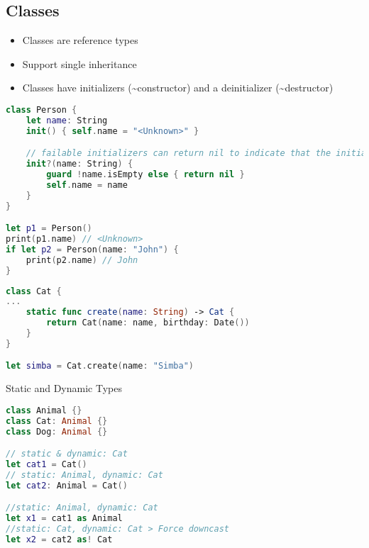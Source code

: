 
\hypertarget{classes}{%
\subsection{Classes}\label{classes}}

\begin{breakbox}

\begin{itemize}
\tightlist
\item
  Classes are reference types
\item
  Support single inheritance
\item
  Classes have initializers (\textasciitilde{}constructor) and a
  deinitializer (\textasciitilde{}destructor)
\end{itemize}

\end{breakbox}
\columnbreak


\begin{breakbox}

\begin{lstlisting}[language=swift]
class Person {
    let name: String
    init() { self.name = "<Unknown>" }

    // failable initializers can return nil to indicate that the initialization failed
    init?(name: String) {
        guard !name.isEmpty else { return nil }
        self.name = name
    }
}

let p1 = Person()
print(p1.name) // <Unknown>
if let p2 = Person(name: "John") {
    print(p2.name) // John
}
\end{lstlisting}
\end{breakbox}

\begin{breakbox}

\begin{lstlisting}[language=swift]
class Cat {
...
    static func create(name: String) -> Cat {
        return Cat(name: name, birthday: Date())
    }
}

let simba = Cat.create(name: "Simba")
\end{lstlisting}
\end{breakbox}

\begin{breakbox}

Static and Dynamic Types

\begin{lstlisting}[language=swift]
class Animal {}
class Cat: Animal {}
class Dog: Animal {}

// static & dynamic: Cat
let cat1 = Cat()
// static: Animal, dynamic: Cat
let cat2: Animal = Cat()

//static: Animal, dynamic: Cat
let x1 = cat1 as Animal   
//static: Cat, dynamic: Cat > Force downcast
let x2 = cat2 as! Cat   

\end{lstlisting}
\end{breakbox}

